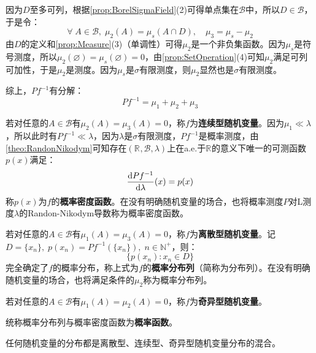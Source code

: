 因为$D$至多可列，根据\cref{prop:BorelSigmaField}(2)可得单点集在$\mathcal{B}$中，所以$D\in\mathcal{B}$，于是令：
\begin{equation*}
	\forall\;A\in\mathcal{B},\;\mu_2(A)=\mu_s(A\cap D),\quad\mu_3=\mu_s-\mu_2
\end{equation*}
由$D$的定义和\cref{prop:Measure}(3)（单调性）可得$\mu_2$是一个非负集函数。因为$\mu_s$是符号测度，所以$\mu_2(\varnothing)=\mu_s(\varnothing)=0$，由\cref{prop:SetOperation}(4)可知$\mu_2$满足可列可加性，于是$\mu_2$是测度。因为$\mu_s$是$\sigma$有限测度，则$\mu_2$显然也是$\sigma$有限测度。\par
综上，$Pf^{-1}$有分解：
\begin{equation*}
	Pf^{-1}=\mu_1+\mu_2+\mu_3
\end{equation*}\par
若对任意的$A\in\mathcal{B}$有$\mu_2(A)=\mu_3(A)=0$，称$f$为\textbf{连续型随机变量}。因为$\mu_1\ll\lambda$，所以此时有$Pf^{-1}\ll\lambda$，因为$\lambda$是$\sigma$有限测度，$Pf^{-1}$是概率测度，由\cref{theo:RandonNikodym}可知存在$(\mathbb{R}^{},\mathcal{B},\lambda)$上在a.e.于$\mathbb{R}^{}$的意义下唯一的可测函数$p(x)$满足：
\begin{equation*}
	\dfrac{\mathop{}\!\mathrm{d} Pf^{-1}}{\mathop{}\!\mathrm{d} \lambda}(x)=p(x)
\end{equation*}
称$p(x)$为$f$的\textbf{概率密度函数}。在没有明确随机变量的场合，也将概率测度$P$对L测度$\lambda$的Randon-Nikodym导数称为概率密度函数。\par
若对任意的$A\in\mathcal{B}$有$\mu_1(A)=\mu_3(A)=0$，称$f$为\textbf{离散型随机变量}。记$D=\{x_n\},\;p(x_n)=Pf^{-1}(\{x_n\}),\;n\in\mathbb{N}^+$，则：
\begin{equation*}
	\{p(x_n):x_n\in D\}
\end{equation*}
完全确定了$f$的概率分布，称上式为$f$的\textbf{概率分布列}（简称为分布列）。在没有明确随机变量的场合，也将满足条件的$\mu_2$称为概率分布列。\par
若对任意的$A\in\mathcal{B}$有$\mu_1(A)=\mu_2(A)=0$，称$f$为\textbf{奇异型随机变量}。\par
统称概率分布列与概率密度函数为\textbf{概率函数}。\par
\begin{theorem}
	任何随机变量的分布都是离散型、连续型、奇异型随机变量分布的混合。
\end{theorem}

